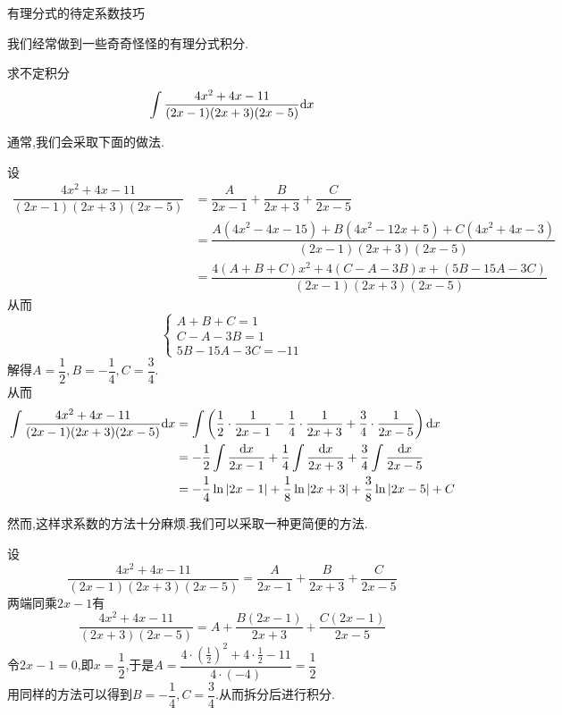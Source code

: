 \documentclass{ctexart}
\begin{document}
\pagestyle{empty}
\begin{center}\large
    有理分式的待定系数技巧
\end{center}
我们经常做到一些奇奇怪怪的有理分式积分.
\begin{problem}
    求不定积分$$\int{\dfrac{4x^2+4x-11}{(2x-1)(2x+3)(2x-5)}\mathrm{d}x}$$
\end{problem}\noindent
通常,我们会采取下面的做法.
\begin{solution}
    设
    \begin{align*}
        \dfrac{4x^2+4x-11}{(2x-1)(2x+3)(2x-5)}
        &= \dfrac{A}{2x-1}+\dfrac{B}{2x+3}+\dfrac{C}{2x-5} \\
        &= \dfrac{A(4x^2-4x-15)+B(4x^2-12x+5)+C(4x^2+4x-3)}{(2x-1)(2x+3)(2x-5)} \\
        &= \dfrac{4(A+B+C)x^2+4(C-A-3B)x+(5B-15A-3C)}{(2x-1)(2x+3)(2x-5)}
    \end{align*}
    从而$$\left\{\begin{array}{l}
        A+B+C=1 \\
        C-A-3B=1 \\
        5B-15A-3C=-11
    \end{array}\right.$$
    解得$A=\dfrac{1}{2},B=-\dfrac{1}{4},C=\dfrac{3}{4}$.\\
    从而\begin{align*}
        \int{\dfrac{4x^2+4x-11}{(2x-1)(2x+3)(2x-5)}\mathrm{d}x}
        &= \int\left(\dfrac{1}{2}\cdot\dfrac{1}{2x-1}-\dfrac{1}{4}\cdot\dfrac{1}{2x+3}+\dfrac{3}{4}\cdot\dfrac{1}{2x-5}\right)\mathrm{d} x\\
        &= -\dfrac{1}{2}\int{\dfrac{\mathrm{d}x}{2x-1}}+\dfrac{1}{4}\int{\dfrac{\mathrm{d}x}{2x+3}}+\dfrac{3}{4}\int{\dfrac{\mathrm{d}x}{2x-5}} \\
        &= -\dfrac{1}{4}\ln{\left|2x-1\right|}+\dfrac{1}{8}\ln{\left|2x+3\right|}+\dfrac{3}{8}\ln{\left|2x-5\right|}+C
    \end{align*}
\end{solution}\noindent
然而,这样求系数的方法十分麻烦.我们可以采取一种更简便的方法.
\begin{solution}
    设$$\dfrac{4x^2+4x-11}{(2x-1)(2x+3)(2x-5)}=\dfrac{A}{2x-1}+\dfrac{B}{2x+3}+\dfrac{C}{2x-5}$$
    两端同乘$2x-1$有$$\dfrac{4x^2+4x-11}{(2x+3)(2x-5)}=A+\dfrac{B(2x-1)}{2x+3}+\dfrac{C(2x-1)}{2x-5}$$
    令$2x-1=0$,即$x=\dfrac{1}{2}$,于是$A=\dfrac{4\cdot\left(\frac{1}{2}\right)^2+4\cdot\frac{1}{2}-11}{4\cdot(-4)}=\dfrac{1}{2}$\\
    用同样的方法可以得到$B=-\dfrac{1}{4},C=\dfrac{3}{4}$.从而拆分后进行积分.
\end{solution}
\end{document}
